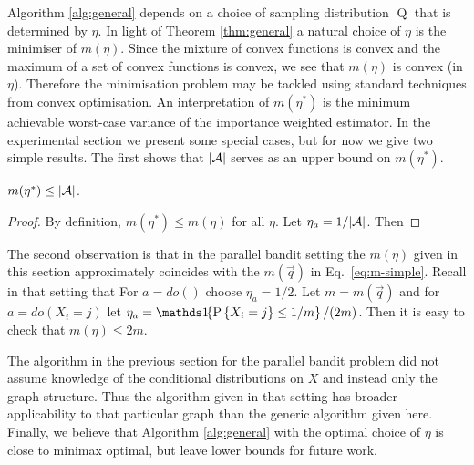 Algorithm \ref{alg:general} depends on a choice of sampling distribution $\operatorname{Q}$ that is determined by $\eta$. In light of Theorem \ref{thm:general}
a natural choice of $\eta$ is the minimiser of $m(\eta)$.
Since the mixture of convex functions is convex and the maximum of a set of convex functions is convex, we see that $m(\eta)$ is convex (in $\eta$).
Therefore the minimisation problem may be tackled using standard techniques from convex optimisation. 
An interpretation of $m(\eta^*)$ is the minimum achievable worst-case variance of the importance weighted estimator.
In the experimental section we present some special cases,
but for now we give two simple results. The first shows that $|\mathcal A|$ serves as an upper bound on $m(\eta^*)$.

\begin{proposition}
$m(\eta^*) \leq |\mathcal A|$.
\end{proposition}

\begin{proof}
By definition, $m(\eta^*) \leq m(\eta)$ for all $\eta$. Let $\eta_a = 1/|\mathcal A|$. Then
\end{proof}

The second observation is that in the parallel bandit setting the $m(\eta)$ given in this section approximately coincides with the $m(\vec{q})$ in Eq.\ \ref{eq:m-simple}.
Recall in that setting that 
For $a = do()$ choose $\eta_a = 1/2$. 
Let $m = m(\vec{q})$ and for $a = do(X_i = j)$ let $\eta_a = \ind{\P{X_i = j} \leq 1/m} / (2m)$. 
Then it is easy to check that $m(\eta) \leq 2m$.  

\begin{remark}
The algorithm in the previous section for the parallel bandit problem did not assume knowledge of the conditional distributions on $X$ and 
instead only the graph structure. Thus the algorithm given in that setting has broader applicability to that particular graph than the generic algorithm given here.
Finally, we believe that Algorithm \ref{alg:general} with the optimal choice of $\eta$ is close to minimax optimal, but leave lower bounds
for future work.
\end{remark}




